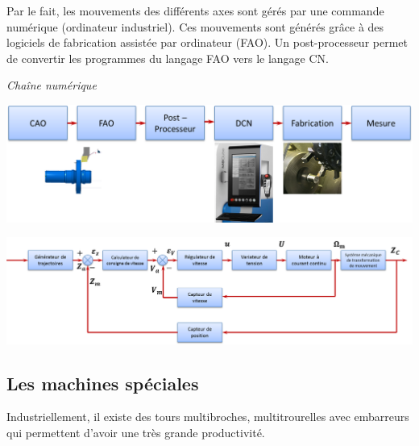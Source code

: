\documentclass[11pt,oneside]{article}
\begin{document}
Par le fait, les mouvements des différents axes sont gérés par une commande numérique (ordinateur industriel). Ces mouvements sont générés grâce à des logiciels de fabrication assistée par ordinateur (FAO). Un post-processeur permet de convertir les programmes du langage FAO vers le langage CN. 

\begin{center}
\textit{Chaîne numérique}

\includegraphics[width=.95\textwidth]{png/chaine_num}
\end{center}


\begin{center}
\includegraphics[width=.95\textwidth]{png/asservissement_cn}
\end{center}



\subsection{Les machines spéciales}
Industriellement, il existe des tours multibroches, multitrourelles avec embarreurs qui permettent d'avoir une très grande productivité. 
\end{document}
